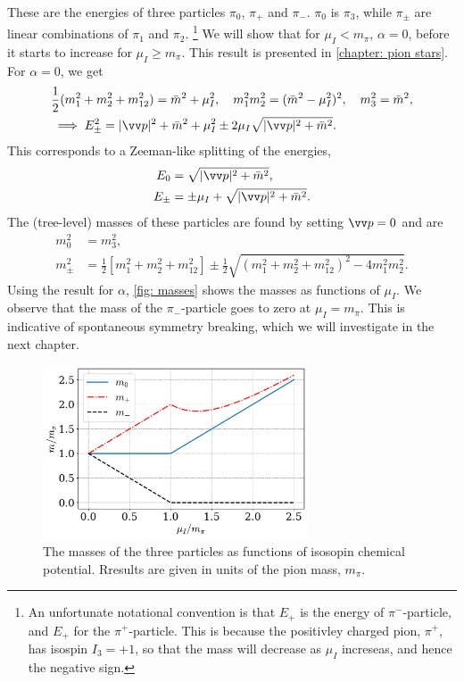 %
These are the energies of three particles $\pi_0$, $\pi_+$ and $\pi_-$.
$\pi_0$ is $\pi_3$, while $\pi_\pm$ are linear combinations of $\pi_1$ and $\pi_2$.
\footnote{An unfortunate notational convention is that $E_+$ is the energy of $\pi^-$-particle, and $E_+$ for the $\pi^+$-particle. This is because the positivley charged pion, $\pi^+$, has isospin $I_3 = +1$, so that the mass will decrease as $\mu_I$ increseas, and hence the negative sign.}
We will show that for $\mu_I < m_\pi$, $\alpha = 0$, before it starts to increase for $\mu_I \geq m_\pi$.
This result is presented in \autoref{chapter: pion stars}.
For $\alpha = 0$, we get
%
\begin{align*}
    &\frac{1}{2}(m_1^2 + m_2^2 + m_{12}^2) 
    =
    \bar m^2 + \mu_I^2, \quad
    m_1^2 m_2^2 = (\bar m^2 - \mu_I^2)^2, \quad
    m_3^2 = \bar m^2, \\
    &\implies E_\pm^2 = |\vv p|^2 + \bar m^2 + \mu_I^2 \pm 2 \mu_I \sqrt{|\vv p|^2 + \bar m^2}.
\end{align*}
%
This corresponds to a Zeeman-like splitting of the energies,
%
\begin{align}
    \label{zeeman energy}
    E_0 & = \sqrt{|\vv p |^2 + \bar m^2}, \\
    \label{zeeman energy 2}
    E_\pm &= \pm \mu_I + \sqrt{|\vv p |^2 + \bar m^2}.
\end{align}
%
The (tree-level) masses of these particles are found by setting $\vv p = 0$ and are
%
\begin{align}
    m_0^2 &= m_3^2, \\
    m_\pm^2
    & =  \frac{1}{2}
    \left[
        m_1^2 + m_2^2 + m_{12}^2 
    \right]
    \pm \frac{1}{2}
    \sqrt{
        \left(
            m_1^2 + m_2^2 + m_{12}^2
        \right)^2
        - 4 m_1^2 m_2^2
    }.
\end{align}
%
Using the result for $\alpha$, \autoref{fig: masses} shows the masses as functions of $\mu_I$.
We observe that the mass of the $\pi_-$-particle goes to zero at $\mu_I = m_\pi$.
This is indicative of spontaneous symmetry breaking, which we will investigate in the next chapter.

\begin{figure}[h]
    \centering
    \includegraphics[width=0.7\textwidth]{../scripts/figurer/leading_order_masses.pdf}
    \caption{The masses of the three particles as functions of isosopin chemical potential. Rresults are given in units of the pion mass, $m_\pi$.}
    \label{fig: masses}
\end{figure}

